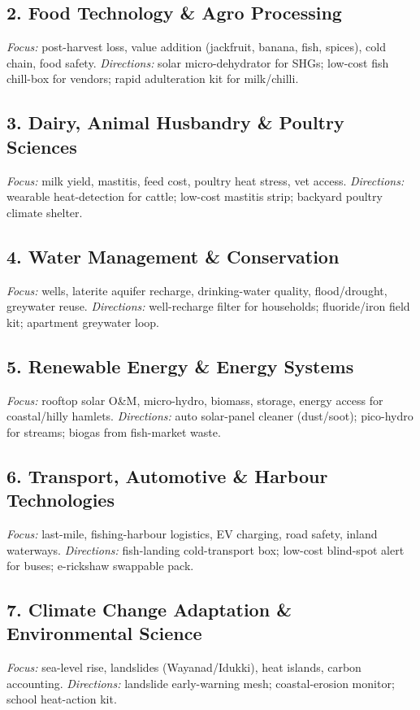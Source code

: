 \documentclass[11pt,a4paper]{article}
\begin{document}
\subsection{2. Food Technology \& Agro Processing}
\textit{Focus:} post-harvest loss, value addition (jackfruit, banana, fish, spices), cold chain, food safety. \textit{Directions:} solar micro-dehydrator for SHGs; low-cost fish chill-box for vendors; rapid adulteration kit for milk/chilli.

\subsection{3. Dairy, Animal Husbandry \& Poultry Sciences}
\textit{Focus:} milk yield, mastitis, feed cost, poultry heat stress, vet access. \textit{Directions:} wearable heat-detection for cattle; low-cost mastitis strip; backyard poultry climate shelter.

\subsection{4. Water Management \& Conservation}
\textit{Focus:} wells, laterite aquifer recharge, drinking-water quality, flood/drought, greywater reuse. \textit{Directions:} well-recharge filter for households; fluoride/iron field kit; apartment greywater loop.

\subsection{5. Renewable Energy \& Energy Systems}
\textit{Focus:} rooftop solar O\&M, micro-hydro, biomass, storage, energy access for coastal/hilly hamlets. \textit{Directions:} auto solar-panel cleaner (dust/soot); pico-hydro for streams; biogas from fish-market waste.

\subsection{6. Transport, Automotive \& Harbour Technologies}
\textit{Focus:} last-mile, fishing-harbour logistics, EV charging, road safety, inland waterways. \textit{Directions:} fish-landing cold-transport box; low-cost blind-spot alert for buses; e-rickshaw swappable pack.

\subsection{7. Climate Change Adaptation \& Environmental Science}
\textit{Focus:} sea-level rise, landslides (Wayanad/Idukki), heat islands, carbon accounting. \textit{Directions:} landslide early-warning mesh; coastal-erosion monitor; school heat-action kit.
\end{document}
